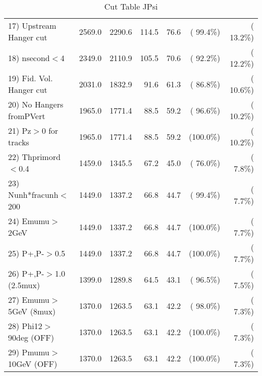 \begin{table}[h!]
\begin{tabular}{||l||r|r|r|r|r|r||}
 17) Upstream Hanger cut  &       2569.0 &       2290.6 &        114.5 &         76.6 & ( 99.4\%) & ( 13.2\%) \\
 18) nsecond$<$4          &       2349.0 &       2110.9 &        105.5 &         70.6 & ( 92.2\%) & ( 12.2\%) \\
 19) Fid. Vol. Hanger cut &       2031.0 &       1832.9 &         91.6 &         61.3 & ( 86.8\%) & ( 10.6\%) \\
 20) No Hangers fromPVert &       1965.0 &       1771.4 &         88.5 &         59.2 & ( 96.6\%) & ( 10.2\%) \\
 21) Pz$>$0 for tracks    &       1965.0 &       1771.4 &         88.5 &         59.2 & (100.0\%) & ( 10.2\%) \\
 22) Thprimord$<$0.4      &       1459.0 &       1345.5 &         67.2 &         45.0 & ( 76.0\%) & (  7.8\%) \\
 23) Nunh*fracunh$<$200   &       1449.0 &       1337.2 &         66.8 &         44.7 & ( 99.4\%) & (  7.7\%) \\
 24) Emumu$>$2GeV         &       1449.0 &       1337.2 &         66.8 &         44.7 & (100.0\%) & (  7.7\%) \\
 25) P+,P-$>$0.5          &       1449.0 &       1337.2 &         66.8 &         44.7 & (100.0\%) & (  7.7\%) \\
 26) P+,P-$>$1.0 (2.5mux) &       1399.0 &       1289.8 &         64.5 &         43.1 & ( 96.5\%) & (  7.5\%) \\
 27) Emumu$>$5GeV  (8mux) &       1370.0 &       1263.5 &         63.1 &         42.2 & ( 98.0\%) & (  7.3\%) \\
 28) Phi12$>$90deg  (OFF) &       1370.0 &       1263.5 &         63.1 &         42.2 & (100.0\%) & (  7.3\%) \\
 29) Pmumu$>$10GeV  (OFF) &       1370.0 &       1263.5 &         63.1 &         42.2 & (100.0\%) & (  7.3\%) \\
 \hline
 \hline
 \end{tabular}
 \caption{Cut Table  JPsi     }
 \label{tab-cutcohjpsi-mumu_cohrhop}
 \end{table}
